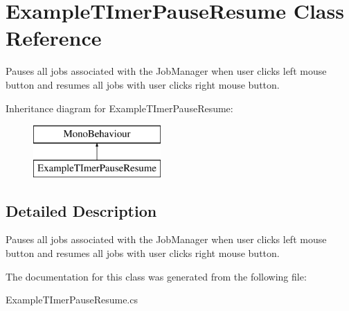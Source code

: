 \hypertarget{class_example_t_imer_pause_resume}{}\section{Example\+T\+Imer\+Pause\+Resume Class Reference}
\label{class_example_t_imer_pause_resume}


Pauses all jobs associated with the Job\+Manager when user clicks left mouse button and resumes all jobs with user clicks right mouse button.  


Inheritance diagram for Example\+T\+Imer\+Pause\+Resume\+:\begin{figure}[H]
\begin{center}
\leavevmode
\includegraphics[height=2.000000cm]{class_example_t_imer_pause_resume}
\end{center}
\end{figure}


\subsection{Detailed Description}
Pauses all jobs associated with the Job\+Manager when user clicks left mouse button and resumes all jobs with user clicks right mouse button. 



The documentation for this class was generated from the following file\+:\begin{DoxyCompactItemize}
\item 
Example\+T\+Imer\+Pause\+Resume.\+cs\end{DoxyCompactItemize}
